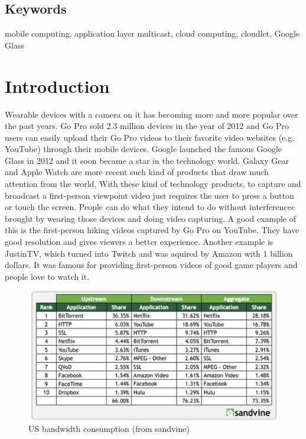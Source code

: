 \documentclass[letterpaper,twocolumn,10pt]{article}
\begin{document}
\subsection*{Keywords}

mobile computing, application layer multicast, cloud computing, cloudlet, Google Glass

\section{Introduction}

Wearable devices with a camera on it has becoming more and more popular over the past years. Go Pro sold 2.3 million devices in the year of 2012 and Go Pro users can easily upload their Go Pro videos to their favorite video websites (e.g. YouTube) through their mobile devices. Google launched the famous Google Glass in 2012 and it soon became a star in the technology world. Galaxy Gear and Apple Watch are more recent such kind of products that draw much attention from the world. With these kind of technology products, to capture and broadcast a first-person viewpoint video just requires the user to press a button or touch the screen. People can do what they intend to do without interferencec brought by wearing those devices and doing video capturing. A good example of this is the first-person hiking videos captured by Go Pro on YouTube. They have good resolution and gives viewers a better experience. Another example is JustinTV, which turned into Twitch and was aquired by Amazon with 1 billion dollars. It was famous for providing first-person videos of good game players and people love to watch it.

\begin{figure}[t]
\begin{center}
\includegraphics[scale=0.3]{pic/bandwidth_rank.png}
\end{center}
\caption{US bandwidth consumption (from sandvine)}
\end{figure}
\end{document}
